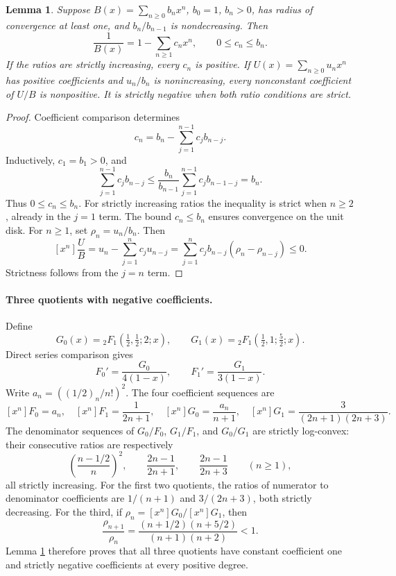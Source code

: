 \documentclass[11pt]{article}
\newtheorem{lemma}{Lemma}
\begin{document}
\begin{lemma}\label{lem:sign}
Suppose \(B(x)=\sum_{n\geq0}b_nx^n\), \(b_0=1\), \(b_n>0\),
has radius of convergence at least one, and \(b_n/b_{n-1}\) is
nondecreasing. Then
\[
 \frac1{B(x)}=1-\sum_{n\geq1}c_nx^n,\qquad 0\leq c_n\leq b_n.
\]
If the ratios are strictly increasing, every \(c_n\) is positive.
If \(U(x)=\sum_{n\geq0}u_nx^n\) has positive coefficients and
\(u_n/b_n\) is nonincreasing, every nonconstant coefficient of \(U/B\)
is nonpositive. It is strictly negative when both ratio
conditions are strict.
\end{lemma}
\begin{proof}
Coefficient comparison determines
\[
 c_n=b_n-\sum_{j=1}^{n-1}c_jb_{n-j}.
\]
Inductively, \(c_1=b_1>0\), and
\[
 \sum_{j=1}^{n-1}c_jb_{n-j}
 \leq\frac{b_n}{b_{n-1}}
      \sum_{j=1}^{n-1}c_jb_{n-1-j}
 =b_n.
\]
Thus \(0\leq c_n\leq b_n\). For strictly increasing ratios the
inequality is strict when \(n\geq2\), already in the \(j=1\) term.
The bound \(c_n\leq b_n\) ensures convergence on the unit disk.
For \(n\geq1\), set \(\rho_n=u_n/b_n\). Then
\[
 [x^n]\frac{U}{B}
 =u_n-\sum_{j=1}^nc_ju_{n-j}
 =\sum_{j=1}^nc_jb_{n-j}(\rho_n-\rho_{n-j})\leq0.
\]
Strictness follows from the \(j=n\) term.
\end{proof}

\paragraph{Three quotients with negative coefficients.}
Define
\[
 G_0(x)={}_2F_1(\tfrac12,\tfrac12;2;x),\qquad
 G_1(x)={}_2F_1(\tfrac12,1;\tfrac52;x).
\]
Direct series comparison gives
\begin{equation}\label{eq:derivatives}
 F_0'=\frac{G_0}{4(1-x)},\qquad
 F_1'=\frac{G_1}{3(1-x)}.
\end{equation}
Write \(a_n=( (1/2)_n/n!)^2\). The four coefficient sequences are
\[
 [x^n]F_0=a_n,\quad [x^n]F_1=\frac1{2n+1},\quad
 [x^n]G_0=\frac{a_n}{n+1},\quad
 [x^n]G_1=\frac3{(2n+1)(2n+3)}.
\]
The denominator sequences of \(G_0/F_0\), \(G_1/F_1\), and \(G_0/G_1\)
are strictly log-convex: their consecutive ratios are respectively
\[
 \left(\frac{n-1/2}{n}\right)^2,\qquad
 \frac{2n-1}{2n+1},\qquad
 \frac{2n-1}{2n+3}\qquad(n\geq1),
\]
all strictly increasing.
For the first two quotients, the ratios of numerator to denominator
coefficients are \(1/(n+1)\) and \(3/(2n+3)\), both strictly decreasing.
For the third, if \(\rho_n=[x^n]G_0/[x^n]G_1\), then
\[
 \frac{\rho_{n+1}}{\rho_n}
 =\frac{(n+1/2)(n+5/2)}{(n+1)(n+2)}<1.
\]
Lemma \ref{lem:sign} therefore proves that all three quotients have
constant coefficient one and strictly negative coefficients
at every positive degree.
\end{document}
